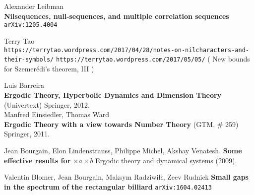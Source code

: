 \documentclass[12pt]{article}
\begin{document}
\begin{thebibliography}{}

\item Alexander Leibman \\ \textbf{Nilsequences, null-sequences, and multiple correlation sequences} \texttt{ arXiv:1205.4004} 
\item 
Terry Tao \\
\texttt{https://terrytao.wordpress.com/2017/04/28/notes-on-nilcharacters-and-their-symbols/}
\texttt{https://terrytao.wordpress.com/2017/05/05/} ( New bounds for Szemer\'{e}di's theorem, III )

\item Luis Barreira \\ \textbf{Ergodic Theory, Hyperbolic
Dynamics and Dimension
Theory} (Univertext) Springer, 2012. \\ 
Manfred Einsiedler, Thomas Ward \\ \textbf{Ergodic Theory
with a view towards Number Theory} (GTM, \# 259) Springer, 2011.

\item Jean Bourgain, Elon Lindenstrauss, Philippe Michel, Akshay Venatesh. \textbf{Some effective results for $\times a \times b$} Ergodic theory and dynamical systems (2009).

\item Valentin Blomer, Jean Bourgain, Maksym Radziwi\l\l, Zeev Rudnick \textbf{Small gaps in the spectrum of the rectangular billiard} \texttt{arXiv:1604.02413}

\end{thebibliography}
\end{document}

